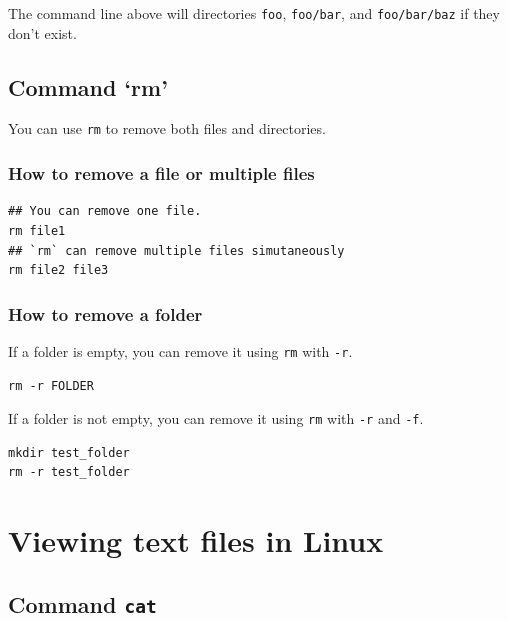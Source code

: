 \documentclass[]{book}
\begin{document}
The command line above will directories \texttt{foo}, \texttt{foo/bar}, and \texttt{foo/bar/baz} if they don't exist.

\hypertarget{command-rm}{%
\subsection{Command `rm'}\label{command-rm}}

You can use \texttt{rm} to remove both files and directories.

\hypertarget{how-to-remove-a-file-or-multiple-files}{%
\subsubsection{How to remove a file or multiple files}\label{how-to-remove-a-file-or-multiple-files}}

\begin{verbatim}
## You can remove one file. 
rm file1 
## `rm` can remove multiple files simutaneously
rm file2 file3 
\end{verbatim}

\hypertarget{how-to-remove-a-folder}{%
\subsubsection{How to remove a folder}\label{how-to-remove-a-folder}}

If a folder is empty, you can remove it using \texttt{rm} with \texttt{-r}.

\begin{verbatim}
rm -r FOLDER
\end{verbatim}

If a folder is not empty, you can remove it using \texttt{rm} with \texttt{-r} and \texttt{-f}.

\begin{verbatim}
mkdir test_folder
rm -r test_folder
\end{verbatim}

\hypertarget{viewing-text-files-in-linux}{%
\section{Viewing text files in Linux}\label{viewing-text-files-in-linux}}

\hypertarget{command-cat}{%
\subsection{\texorpdfstring{Command \texttt{cat}}{Command cat}}\label{command-cat}}
\end{document}
